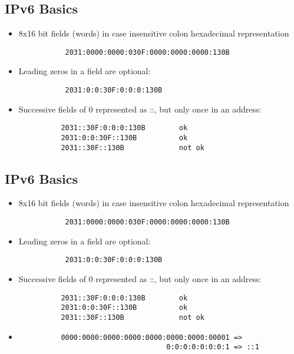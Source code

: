 \documentclass[xga]{xdvislides}
\begin{document}
\subsection{IPv6 Basics}
\begin{itemize}
	\item 8x16 bit fields (words) in case insensitive colon hexadecimal
		representation
\begin{verbatim}
           2031:0000:0000:030F:0000:0000:0000:130B
\end{verbatim}
	\item Leading zeros in a field are optional:
\begin{verbatim}
           2031:0:0:30F:0:0:0:130B
\end{verbatim}
	\item Successive fields of 0 represented as ::, but only once in
			an address:
\begin{verbatim}
          2031::30F:0:0:0:130B        ok
          2031:0:0:30F::130B          ok
          2031::30F::130B             not ok
\end{verbatim}
\end{itemize}

\subsection{IPv6 Basics}
\begin{itemize}
	\item 8x16 bit fields (words) in case insensitive colon hexadecimal
		representation
\begin{verbatim}
           2031:0000:0000:030F:0000:0000:0000:130B
\end{verbatim}
	\item Leading zeros in a field are optional:
\begin{verbatim}
           2031:0:0:30F:0:0:0:130B
\end{verbatim}
	\item Successive fields of 0 represented as ::, but only once in
			an address:
\begin{verbatim}
          2031::30F:0:0:0:130B        ok
          2031:0:0:30F::130B          ok
          2031::30F::130B             not ok
\end{verbatim}
	\item
\begin{verbatim}
          0000:0000:0000:0000:0000:0000:0000:00001 =>
                                   0:0:0:0:0:0:0:1 => ::1
\end{verbatim}
\end{itemize}
\end{document}
